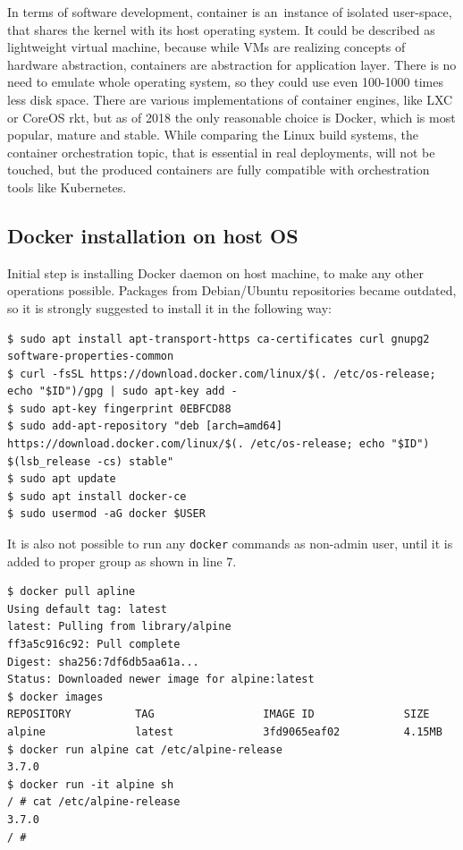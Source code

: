 \documentclass[printmode]{mgr}
\begin{document}
In terms of software development, container is an~instance of isolated user-space, that shares the kernel with its host operating system.\cite{web:what-container}
It could be described as lightweight virtual machine, because while VMs are realizing concepts of hardware abstraction, containers are abstraction for application layer.
There is no need to emulate whole operating system, so they could use even 100-1000 times less disk space.
There are various implementations of container engines, like LXC or CoreOS rkt, but as of 2018 the only reasonable choice is Docker, which is most popular, mature and stable.\cite{web:why-docker}
While comparing the Linux build systems, the container orchestration topic, that is essential in real deployments\cite{web:container-orchestration}, will not be touched, but the produced containers are fully compatible with orchestration tools like Kubernetes.

\subsection*{Docker installation on host OS}

Initial step is installing Docker daemon on host machine, to make any other operations possible.
Packages from Debian/Ubuntu repositories became outdated, so it is strongly suggested to install it in the following way:

\begin{lstlisting}
$ sudo apt install apt-transport-https ca-certificates curl gnupg2 software-properties-common
$ curl -fsSL https://download.docker.com/linux/$(. /etc/os-release; echo "$ID")/gpg | sudo apt-key add -
$ sudo apt-key fingerprint 0EBFCD88
$ sudo add-apt-repository "deb [arch=amd64] https://download.docker.com/linux/$(. /etc/os-release; echo "$ID") $(lsb_release -cs) stable"
$ sudo apt update
$ sudo apt install docker-ce
$ sudo usermod -aG docker $USER
\end{lstlisting}

It is also not possible to run any \verb|docker| commands as non-admin user, until it is added to proper group as shown in line 7. \cite{web:docker-permissions}

\begin{lstlisting}
$ docker pull apline
Using default tag: latest
latest: Pulling from library/alpine
ff3a5c916c92: Pull complete 
Digest: sha256:7df6db5aa61a...
Status: Downloaded newer image for alpine:latest
$ docker images
REPOSITORY          TAG                 IMAGE ID              SIZE
alpine              latest              3fd9065eaf02          4.15MB
$ docker run alpine cat /etc/alpine-release
3.7.0
$ docker run -it alpine sh
/ # cat /etc/alpine-release
3.7.0
/ #
\end{lstlisting}
\end{document}

